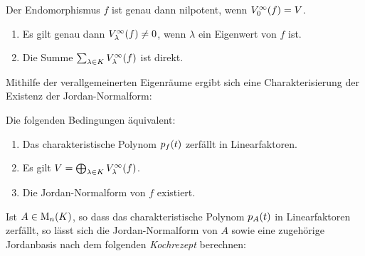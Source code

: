 \begin{example}
  Der Endomorphismus $f$ ist genau dann nilpotent, wenn $\geigenspace{V}{f}{0} = V$.
\end{example}

\begin{lemma}
  \leavevmode
  \begin{enumerate}
    \item
      Es gilt genau dann $\geigenspace{V}{f}{\lambda} \neq 0$, wenn $\lambda$ ein Eigenwert von $f$ ist.
    \item
      Die Summe $\sum_{\lambda \in K} \geigenspace{V}{f}{\lambda}$ ist direkt.
  \end{enumerate}
\end{lemma}

Mithilfe der verallgemeinerten Eigenräume ergibt sich eine Charakterisierung der Existenz der Jordan-Normalform:

\begin{theorem}
  \label{theorem: existence of generalized eigespace decomposition and jordan normal form}
  Die folgenden Bedingungen äquivalent:
  \begin{enumerate}
    \item
      Das charakteristische Polynom $\charpol{f}(t)$ zerfällt in Linearfaktoren.
    \item
      Es gilt $V = \bigoplus_{\lambda \in K} \geigenspace{V}{f}{\lambda}$.
    \item
      Die Jordan-Normalform von $f$ existiert.
  \end{enumerate}
\end{theorem}

Ist $A \in \matrices{n}{K}$, so dass das charakteristische Polynom $\charpol{A}(t)$ in Linearfaktoren zerfällt, so lässt sich die Jordan-Normalform von $A$ sowie eine zugehörige Jordanbasis nach dem folgenden \emph{Kochrezept} berechnen:

